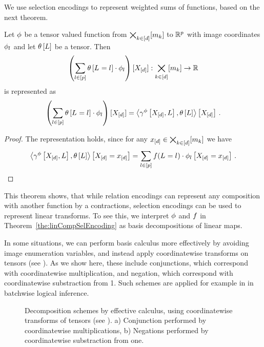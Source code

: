 We use selection encodings to represent weighted sums of functions, based on the next theorem.

\begin{theorem}
    \label{the:linCompSelEncoding}
    Let $\phi$ be a tensor valued function from $\bigtimes_{k\in[d]}[m_{k}]$ to $\mathbb{R}^{p}$ with image coordinates $\phi_{l}$ and let $\theta\left[L\right]$ be a tensor.
    Then
    \[ \left(\sum_{l\in[p]}\theta\left[L_{}=l_{}\right] \cdot \phi_{l} \right) [X_{[d]}] : \bigtimes_{k\in[d]}[m_{k}] \rightarrow \mathbb{R} \]
    is represented as
    \[ \left(\sum_{l\in[p]}\theta\left[L_{}=l_{}\right]\cdot \phi_{l} \right) [X_{[d]}]
    = \left\langle \gamma^{\phi}\left[X_{[d]},L\right] , \theta\left[L\right]\right\rangle \left[ X_{[d]} \right] \, . \]
\end{theorem}
\begin{proof}
    The representation holds, since for any $x_{[d]}\in\bigtimes_{k\in[d]}[m_{k}]$ we have
    \begin{align*}
        \left\langle \gamma^{\phi}\left[X_{[d]},L\right],\theta\left[L\right]\right\rangle \left[ X_{[d]}=x_{[d]} \right]
        = \sum_{l\in[p]}f(L_{}=l_{})\cdot\phi_{l}\left[X_{[d]}=x_{[d]}\right] \, .
    \end{align*}
\end{proof}

This theorem shows, that while relation encodings can represent any composition with another function by a contractions, selection encodings can be used to represent linear transforms.
To see this, we interpret $\phi$ and $f$ in Theorem~\ref{the:linCompSelEncoding} as basis decompositions of linear maps.


\label{sec:effectiveCalculus}

In some situations, we can perform basis calculus more effectively by avoiding image enumeration variables, and instead apply coordinatewise transforms on tensors (see ).
As we show here, these include conjunctions, which correspond with coordinatewise multiplication, and negation, which correspond with coordinatewise substraction from 1.
Such schemes are applied for example in \cite{tsilionis_tensor-based_2024} in batchwise logical inference.

\begin{figure}
\begin{center}
	
\end{center}
\caption{Decomposition schemes by effective calculus, using coordinatewise transforms of tensors (see ).
	a) Conjunction performed by coordinatewise multiplications, b) Negations performed by coordinatewise substraction from one.}\label{fig:ConNegDecomposition}
\end{figure}

